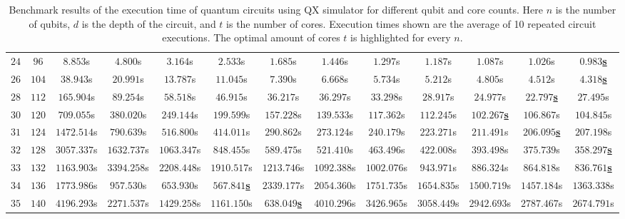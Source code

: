 \begin{table}
{\begin{tabular}{ccccccccccccc}
            $24$ & $96$ & $8.853$s & $4.800$s & $3.164$s & $2.533$s & $1.685$s & $1.446$s & $1.297$s & $1.187$s & $1.087$s & $1.026$s & \underline{$\mathbf{0.983}$\textbf{s}} \\
            $26$ & $104$ & $38.943$s & $20.991$s & $13.787$s & $11.045$s & $7.390$s & $6.668$s & $5.734$s & $5.212$s & $4.805$s & $4.512$s & \underline{$\mathbf{4.318}$\textbf{s}} \\
            $28$ & $112$ & $165.904$s & $89.254$s & $58.518$s & $46.915$s & $36.217$s & $36.297$s & $33.298$s & $28.917$s & $24.977$s & \underline{$\mathbf{22.797}$\textbf{s}} & $27.495$s \\
            $30$ & $120$ & $709.055$s & $380.020$s & $249.144$s & $199.599$s & $157.228$s & $139.533$s & $117.362$s & $112.245$s & \underline{$\mathbf{102.267}$\textbf{s}} & $106.867$s & $104.845$s \\
            $31$ & $124$ & $1472.514$s & $790.639$s & $516.800$s & $414.011$s & $290.862$s & $273.124$s & $240.179$s & $223.271$s & $211.491$s & \underline{$\mathbf{206.095}$\textbf{s}} & $207.198$s \\
            $32$ & $128$ & $3057.337$s & $1632.737$s & $1063.347$s & $848.455$s & $589.475$s & $521.410$s & $463.496$s & $422.008$s & $393.498$s & $375.739$s & \underline{$\mathbf{358.297}$\textbf{s}} \\
            $33$ & $132$ & $1163.903$s & $3394.258$s & $2208.448$s & $1910.517$s & $1213.746$s & $1092.388$s & $1002.076$s & $943.971$s & $886.324$s & $864.818$s & \underline{$\mathbf{836.761}$\textbf{s}} \\
            $34$ & $136$ & $1773.986$s & $957.530$s & $653.930$s & \underline{$\mathbf{567.841}$\textbf{s}} & $2339.177$s & $2054.360$s & $1751.735$s & $1654.835$s & $1500.719$s & $1457.184$s & $1363.338$s \\
            $35$ & $140$ & $4196.293$s & $2271.537$s & $1429.258$s & $1161.150$s & \underline{$\mathbf{638.049}$\textbf{s}} & $4010.296$s & $3426.965$s & $3058.449$s & $2942.693$s & $2787.467$s & $2674.791$s \\
        \end{tabular}
    }
    \caption[Benchmark results of the execution time of quantum circuits using QX simulator for different qubit and core counts.]{
        Benchmark results of the execution time of quantum circuits using QX simulator for different qubit and core counts.
        Here $n$ is the number of qubits, $d$ is the depth of the circuit, and $t$ is the number of cores.
        Execution times shown are the average of 10 repeated circuit executions.
        The optimal amount of cores $t$ is highlighted for every $n$.
    }
    \label{table:qx-benchmark}
\end{table}


